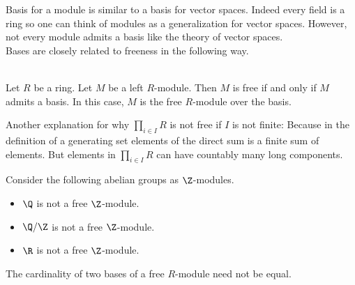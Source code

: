 \documentclass[a4paper]{article}
\begin{document}
Basis for a module is similar to a basis for vector spaces. Indeed every field is a ring so one can think of modules as a generalization for vector spaces. However, not every module admits a basis like the theory of vector spaces. \\

Bases are closely related to freeness in the following way. 

\begin{prp}{}{}\\
Let $R$ be a ring. Let $M$ be a left $R$-module. Then $M$ is free if and only if $M$ admits a basis. In this case, $M$ is the free $R$-module over the basis. 
\end{prp}

Another explanation for why $\prod_{i\in I}R$ is not free if $I$ is not finite: Because in the definition of a generating set elements of the direct sum is a finite sum of elements. But elements in $\prod_{i\in I}R$ can have countably many long components. 

\begin{eg}{}{} Consider the following abelian groups as $\Z$-modules. 
\begin{itemize}
\item $\Q$ is not a free $\Z$-module. 
\item $\Q/\Z$ is not a free $\Z$-module. 
\item $\R$ is not a free $\Z$-module. 
\end{itemize}
\end{eg}

The cardinality of two bases of a free $R$-module need not be equal. 
\end{document}
